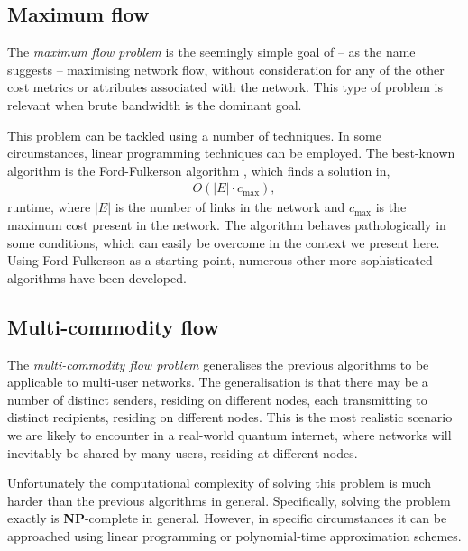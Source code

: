 \subsection{Maximum flow} \label{sec:max_flow_prob} 

The \textit{maximum flow problem} \cite{???} is the seemingly simple goal of -- as the name suggests -- maximising network flow, without consideration for any of the other cost metrics or attributes associated with the network. This type of problem is relevant when brute bandwidth is the dominant goal.

This problem can be tackled using a number of techniques. In some circumstances, linear programming techniques can be employed. The best-known algorithm is the Ford-Fulkerson algorithm \cite{???}, which finds a solution in,
\begin{align}
	O(|E|\cdot c_\mathrm{max}),
\end{align}
runtime, where $|E|$ is the number of links in the network and $c_\mathrm{max}$ is the maximum cost present in the network. The algorithm behaves pathologically in some conditions, which can easily be overcome in the context we present here. Using Ford-Fulkerson as a starting point, numerous other more sophisticated algorithms have been developed.

%
%

\subsection{Multi-commodity flow} \label{sec:multi_comm_flow} 

The \textit{multi-commodity flow problem} \cite{???} generalises the previous algorithms to be applicable to multi-user networks. The generalisation is that there may be a number of distinct senders, residing on different nodes, each transmitting to distinct recipients, residing on different nodes. This is the most realistic scenario we are likely to encounter in a real-world quantum internet, where networks will inevitably be shared by many users, residing at different nodes.

Unfortunately the computational complexity of solving this problem is much harder than the previous algorithms in general. Specifically, solving the problem exactly is \textbf{NP}-complete in general. However, in specific circumstances it can be approached using linear programming or polynomial-time approximation schemes.

